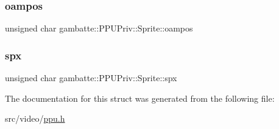 \subsubsection{\texorpdfstring{oampos}{oampos}}
{\footnotesize\ttfamily unsigned char gambatte\+::\+P\+P\+U\+Priv\+::\+Sprite\+::oampos}

\mbox{\label{structgambatte_1_1PPUPriv_1_1Sprite_aa9f6c5acaecae4ca4ab8521616ae7036}} 
\subsubsection{\texorpdfstring{spx}{spx}}
{\footnotesize\ttfamily unsigned char gambatte\+::\+P\+P\+U\+Priv\+::\+Sprite\+::spx}



The documentation for this struct was generated from the following file\+:\begin{DoxyCompactItemize}
\item 
src/video/\hyperlink{ppu_8h}{ppu.\+h}\end{DoxyCompactItemize}
